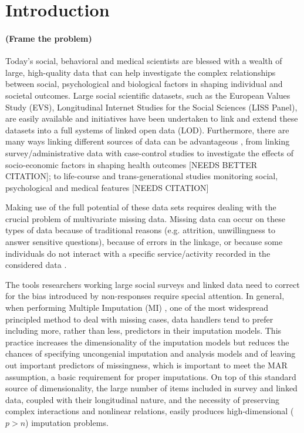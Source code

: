 \section{Introduction}

\paragraph{(Frame the problem)}

Today’s social, behavioral and medical scientists are blessed with a wealth of large, high-quality data that
can help investigate the complex relationships between social, psychological and biological factors in 
shaping individual and societal outcomes.
Large social scientific datasets, such as the European Values Study (EVS), Longitudinal Internet Studies for the 
Social Sciences (LISS Panel), are easily available and initiatives have been undertaken to link and extend these 
datasets into a full systems of linked open data (LOD).
Furthermore, there are many ways linking different sources of data can be advantageous \citep{jutteEtAl:2011}, from 
linking survey/administrative data with case-control studies to investigate the effects of socio-economic factors in 
shaping health outcomes \citep{kozyrskyjEtAl:2009} [NEEDS BETTER CITATION]; to life-course and trans-generational studies 
monitoring social, psychological and medical features [NEEDS CITATION]

Making use of the full potential of these data sets requires dealing with the crucial problem of multivariate
missing data.
Missing data can occur on these types of data because of traditional reasons (e.g. attrition, unwillingness
to answer sensitive questions), because of errors in the linkage, or because some individuals do not interact
with a specific service/activity recorded in the considered data \citep{harronEtAl:2017}.

The tools researchers working large social surveys and linked data need to correct for the bias introduced by non-responses 
require special attention.
In general, when performing Multiple Imputation (MI) \citep{rubin:1987}, one of the most widespread principled method to deal 
with missing cases, data handlers tend to prefer including more, rather than less, predictors in their imputation models.
This practice increases the dimensionality of the imputation models but reduces the chances of specifying uncongenial imputation and 
analysis models \citep{meng:1994} and of leaving out important predictors of missingness, which is important to meet the MAR 
assumption, a basic requirement for proper imputations.
On top of this standard source of dimensionality, the large number of items included in survey and linked data, coupled 
with their longitudinal nature, and the necessity of preserving complex interactions and nonlinear relations, easily 
produces high-dimensional ($p>n$) imputation problems.

